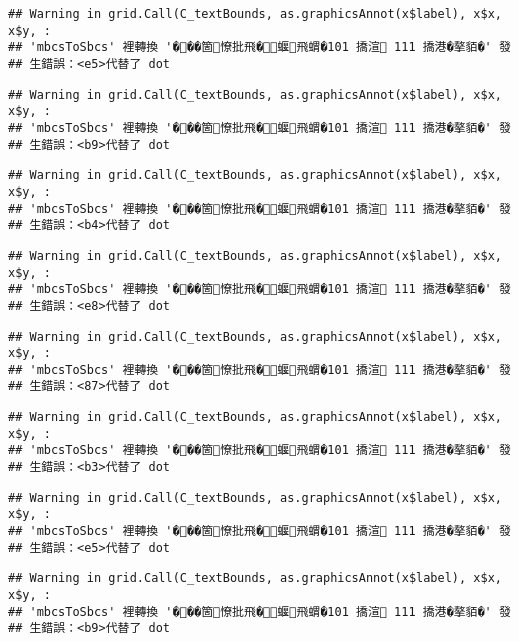 \documentclass[
]{article}
\begin{document}
\begin{verbatim}
## Warning in grid.Call(C_textBounds, as.graphicsAnnot(x$label), x$x, x$y, :
## 'mbcsToSbcs' 裡轉換 '���箇憭批飛�蝘飛蝟�101 撟渲 111 撟港�摮貊�' 發
## 生錯誤：<e5>代替了 dot
\end{verbatim}

\begin{verbatim}
## Warning in grid.Call(C_textBounds, as.graphicsAnnot(x$label), x$x, x$y, :
## 'mbcsToSbcs' 裡轉換 '���箇憭批飛�蝘飛蝟�101 撟渲 111 撟港�摮貊�' 發
## 生錯誤：<b9>代替了 dot
\end{verbatim}

\begin{verbatim}
## Warning in grid.Call(C_textBounds, as.graphicsAnnot(x$label), x$x, x$y, :
## 'mbcsToSbcs' 裡轉換 '���箇憭批飛�蝘飛蝟�101 撟渲 111 撟港�摮貊�' 發
## 生錯誤：<b4>代替了 dot
\end{verbatim}

\begin{verbatim}
## Warning in grid.Call(C_textBounds, as.graphicsAnnot(x$label), x$x, x$y, :
## 'mbcsToSbcs' 裡轉換 '���箇憭批飛�蝘飛蝟�101 撟渲 111 撟港�摮貊�' 發
## 生錯誤：<e8>代替了 dot
\end{verbatim}

\begin{verbatim}
## Warning in grid.Call(C_textBounds, as.graphicsAnnot(x$label), x$x, x$y, :
## 'mbcsToSbcs' 裡轉換 '���箇憭批飛�蝘飛蝟�101 撟渲 111 撟港�摮貊�' 發
## 生錯誤：<87>代替了 dot
\end{verbatim}

\begin{verbatim}
## Warning in grid.Call(C_textBounds, as.graphicsAnnot(x$label), x$x, x$y, :
## 'mbcsToSbcs' 裡轉換 '���箇憭批飛�蝘飛蝟�101 撟渲 111 撟港�摮貊�' 發
## 生錯誤：<b3>代替了 dot
\end{verbatim}

\begin{verbatim}
## Warning in grid.Call(C_textBounds, as.graphicsAnnot(x$label), x$x, x$y, :
## 'mbcsToSbcs' 裡轉換 '���箇憭批飛�蝘飛蝟�101 撟渲 111 撟港�摮貊�' 發
## 生錯誤：<e5>代替了 dot
\end{verbatim}

\begin{verbatim}
## Warning in grid.Call(C_textBounds, as.graphicsAnnot(x$label), x$x, x$y, :
## 'mbcsToSbcs' 裡轉換 '���箇憭批飛�蝘飛蝟�101 撟渲 111 撟港�摮貊�' 發
## 生錯誤：<b9>代替了 dot
\end{verbatim}
\end{document}
